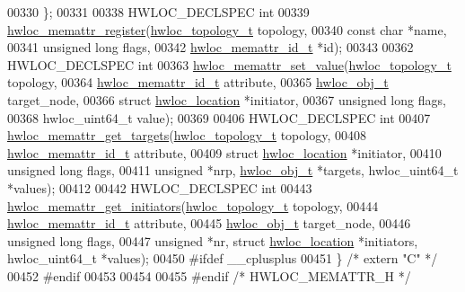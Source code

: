 \begin{DoxyCode}
00330 \};
00331 
00338 HWLOC\_DECLSPEC \textcolor{keywordtype}{int}
00339 \hyperlink{a00212_ga770657d1e44b09e93e09f623936c1e5f}{hwloc\_memattr\_register}(\hyperlink{a00186_ga9d1e76ee15a7dee158b786c30b6a6e38}{hwloc\_topology\_t} topology,
00340                        \textcolor{keyword}{const} \textcolor{keywordtype}{char} *name,
00341                        \textcolor{keywordtype}{unsigned} \textcolor{keywordtype}{long} flags,
00342                        \hyperlink{a00211_gacc82003a8610be554615995f0996c888}{hwloc\_memattr\_id\_t} *\textcolor{keywordtype}{id});
00343 
00362 HWLOC\_DECLSPEC \textcolor{keywordtype}{int}
00363 \hyperlink{a00212_ga960529c08b25cf15825e0f72ecceb504}{hwloc\_memattr\_set\_value}(\hyperlink{a00186_ga9d1e76ee15a7dee158b786c30b6a6e38}{hwloc\_topology\_t} topology,
00364                         \hyperlink{a00211_gacc82003a8610be554615995f0996c888}{hwloc\_memattr\_id\_t} attribute,
00365                         \hyperlink{a00238}{hwloc\_obj\_t} target\_node,
00366                         \textcolor{keyword}{struct} \hyperlink{a00314}{hwloc\_location} *initiator,
00367                         \textcolor{keywordtype}{unsigned} \textcolor{keywordtype}{long} flags,
00368                         hwloc\_uint64\_t value);
00369 
00406 HWLOC\_DECLSPEC \textcolor{keywordtype}{int}
00407 \hyperlink{a00212_ga3177cc0ab47e4dd1fa69ca1df4c7cb1a}{hwloc\_memattr\_get\_targets}(\hyperlink{a00186_ga9d1e76ee15a7dee158b786c30b6a6e38}{hwloc\_topology\_t} topology,
00408                           \hyperlink{a00211_gacc82003a8610be554615995f0996c888}{hwloc\_memattr\_id\_t} attribute,
00409                           \textcolor{keyword}{struct} \hyperlink{a00314}{hwloc\_location} *initiator,
00410                           \textcolor{keywordtype}{unsigned} \textcolor{keywordtype}{long} flags,
00411                           \textcolor{keywordtype}{unsigned} *nrp, \hyperlink{a00238}{hwloc\_obj\_t} *targets, hwloc\_uint64\_t *values);
00412 
00442 HWLOC\_DECLSPEC \textcolor{keywordtype}{int}
00443 \hyperlink{a00212_ga049aaa860dcbbf0792f0fd4251a99ec0}{hwloc\_memattr\_get\_initiators}(\hyperlink{a00186_ga9d1e76ee15a7dee158b786c30b6a6e38}{hwloc\_topology\_t} topology,
00444                              \hyperlink{a00211_gacc82003a8610be554615995f0996c888}{hwloc\_memattr\_id\_t} attribute,
00445                              \hyperlink{a00238}{hwloc\_obj\_t} target\_node,
00446                              \textcolor{keywordtype}{unsigned} \textcolor{keywordtype}{long} flags,
00447                              \textcolor{keywordtype}{unsigned} *nr, \textcolor{keyword}{struct} \hyperlink{a00314}{hwloc\_location} *initiators, hwloc\_uint64\_t 
      *values);
00450 \textcolor{preprocessor}{#ifdef \_\_cplusplus}
00451 \} \textcolor{comment}{/* extern "C" */}
00452 \textcolor{preprocessor}{#endif}
00453 
00454 
00455 \textcolor{preprocessor}{#endif }\textcolor{comment}{/* HWLOC\_MEMATTR\_H */}\textcolor{preprocessor}{}
\end{DoxyCode}
